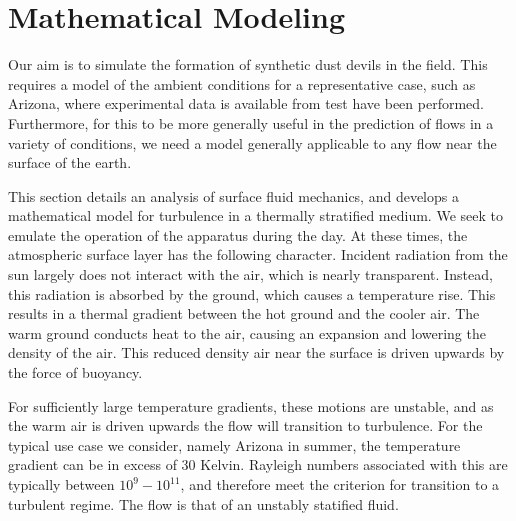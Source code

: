 \section{Mathematical Modeling}
\label{sec:mathmodel}


%
%

Our aim is to simulate the formation of synthetic dust devils in the
field. This requires a model of the ambient conditions for a
representative case, such as Arizona, where experimental data is
available from test have been performed. Furthermore, for this to be
more generally useful in the prediction of flows in a variety of
conditions, we need a model generally applicable to any flow near the
surface of the earth.  

This section details an analysis of surface fluid mechanics, and
develops a mathematical model for turbulence in a thermally stratified
medium. We seek to emulate the operation of the apparatus during the day. 
At these times, the atmospheric surface layer has the following character. 
Incident radiation from the sun largely does not interact with the
air, which is nearly transparent. Instead, this radiation is absorbed by
the ground, which causes a temperature rise. This results in a thermal
gradient between the hot ground and the cooler air. The warm ground
conducts heat to the air, causing an expansion and lowering the density
of the air. This reduced density air near the surface is driven upwards
by the force of buoyancy.  

For sufficiently large temperature gradients, these motions are
unstable, and as the warm air is driven upwards the flow will transition
to turbulence. For the typical use case we consider, namely Arizona in
summer, the temperature gradient can be in excess of 30 Kelvin. 
Rayleigh numbers associated with this are typically between $10^{9} -
10^{11}$, and therefore meet the criterion for transition to a turbulent
regime. The flow is that of an unstably statified fluid. 

